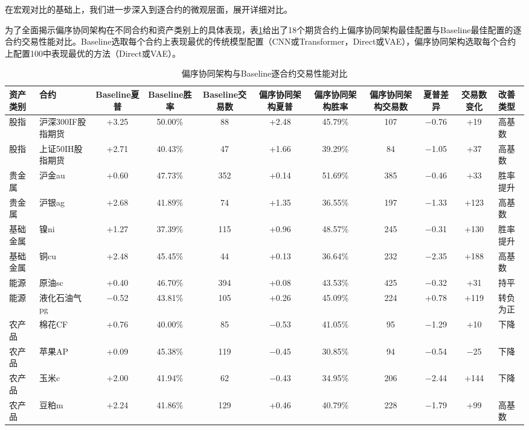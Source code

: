 在宏观对比的基础上，我们进一步深入到逐合约的微观层面，展开详细对比。



为了全面揭示偏序协同架构在不同合约和资产类别上的具体表现，表\ref{tab:gcaVsBaselineDetail}给出了18个期货合约上偏序协同架构最佳配置与Baseline最佳配置的逐合约交易性能对比。Baseline选取每个合约上表现最优的传统模型配置（CNN或Transformer，Direct或VAE），偏序协同架构选取每个合约上配置100中表现最优的方法（Direct或VAE）。


\begin{table}
\centering
\footnotesize
\caption{偏序协同架构与Baseline逐合约交易性能对比}
\label{tab:gcaVsBaselineDetail}
\begin{tabular}{llccccccccl}
\toprule
\textbf{资产类别} & \textbf{合约} & \textbf{Baseline夏普} & \textbf{Baseline胜率} & \textbf{Baseline交易数} & \textbf{偏序协同架构夏普} & \textbf{偏序协同架构胜率} & \textbf{偏序协同架构交易数} & \textbf{夏普差异} & \textbf{交易数变化} & \textbf{改善类型} \\
\midrule
股指 & 沪深300IF股指期货 & +3.25 & 50.00\% & 88 & +2.48 & 45.79\% & 107 & $-$0.76 & +19 & 高基数 \\
股指 & 上证50IH股指期货 & +2.71 & 40.43\% & 47 & +1.66 & 39.29\% & 84 & $-$1.05 & +37 & 高基数 \\
贵金属 & 沪金au & +0.60 & 47.73\% & 352 & +0.14 & 51.69\% & 385 & $-$0.46 & +33 & 胜率提升 \\
贵金属 & 沪银ag & +2.68 & 41.89\% & 74 & +1.35 & 36.55\% & 197 & $-$1.33 & +123 & 高基数 \\
基础金属 & 镍ni & +1.27 & 37.39\% & 115 & +0.96 & 48.57\% & 245 & $-$0.31 & +130 & 胜率提升 \\
基础金属 & 铜cu & +2.48 & 45.45\% & 44 & +0.13 & 36.64\% & 232 & $-$2.35 & +188 & 高基数 \\
能源 & 原油sc & +0.40 & 46.70\% & 394 & +0.08 & 43.53\% & 425 & $-$0.32 & +31 & 持平 \\
能源 & 液化石油气pg & $-$0.52 & 43.81\% & 105 & +0.26 & 45.09\% & 224 & +0.78 & +119 & 转负为正 \\
农产品 & 棉花CF & +0.76 & 40.00\% & 85 & $-$0.53 & 41.05\% & 95 & $-$1.29 & +10 & 下降 \\
农产品 & 苹果AP & +0.09 & 45.38\% & 119 & $-$0.45 & 30.85\% & 94 & $-$0.54 & $-$25 & 下降 \\
农产品 & 玉米c & +2.00 & 41.94\% & 62 & $-$0.43 & 34.95\% & 206 & $-$2.44 & +144 & 下降 \\
农产品 & 豆粕m & +2.24 & 41.86\% & 129 & +0.46 & 40.79\% & 228 & $-$1.79 & +99 & 高基数 \\

\end{tabular}
\end{table}
